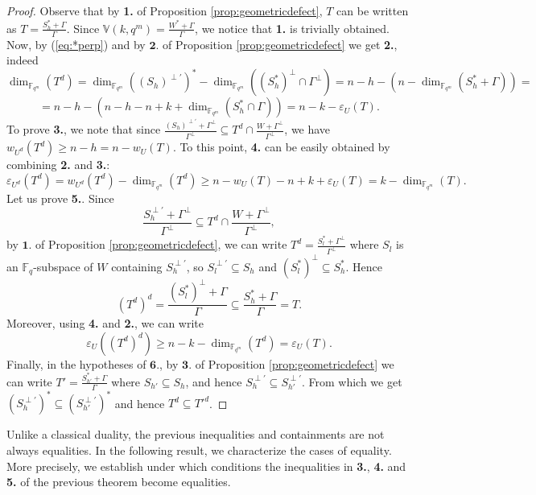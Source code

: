 \documentclass[11pt]{amsart}
\newcommand{\fqm}{\mathbb{F}_{q^m}}
\newcommand{\fq}{{\mathbb F}_{q}}
\begin{document}
\begin{proof}
Observe that by  {\bf 1.} of Proposition \ref{prop:geometricdefect}, $T$ can be written as $T=\frac{S_h^*+\Gamma}{\Gamma}$.
Since  $\mathbb{V}(k,q^m)=\frac{W^*+\Gamma}{\Gamma}$, we notice that {\bf 1.} is trivially obtained. Now, by (\ref{eq:*perp}) and by $\mathbf 2.$ of Proposition \ref{prop:geometricdefect} we get {\bf 2.}, indeed
\[ \dim_{\fqm} (T^d)= \dim_{\fqm} ((S_h)^{\perp'})^* - \dim_{\fqm} ((S_h^*)^\perp \cap \Gamma^\perp)= n-h -(n- \dim_{\fqm} (S_h^* + \Gamma))= \]
\[=n-h-(n-h-n+k+\dim_{\fqm}(S_h^* \cap \Gamma))=n-k-\varepsilon_{U}(T). \]
To prove {\bf 3.}, we note that since $\frac{(S_h)^{\perp'}+\Gamma^\perp}{\Gamma^\perp} \subseteq {T}^d \cap \frac{W+\Gamma^\perp}{\Gamma^\perp}$, we have $w_{U^d}(T^d)\geq n-h=n-w_{U}(T)$. 
To this point, {\bf 4.} can be easily obtained by combining {\bf 2.} and {\bf 3.}: 
\[\varepsilon_{U^d}(T^d)=w_{U^d}(T^d)-\dim_{\fqm} (T^d)\geq n-w_{U}(T) -n+k+\varepsilon_{U}(T)=k- \dim_{\fqm} (T).\]
Let us prove {\bf 5.}.  Since
 \[\frac{S_h^{\perp'}+\Gamma^\perp}{\Gamma^\perp} \subseteq {T}^d \cap \frac{W+\Gamma^\perp}{\Gamma^\perp},\]
  by $\mathbf 1.$ of Proposition \ref{prop:geometricdefect}, we can write ${T}^d=\frac{S_l^*+\Gamma^\perp}{\Gamma^\perp}$ where $S_l$ is an $\fq$-subspace of $W$ containing $S_h^{\perp'}$, so $S_l^{\perp' }\subseteq S_h$ and $(S_l^*)^{\perp}\subseteq S_h^*$. Hence
 \[ ({T}^d)^d=\frac{(S_l^*)^\perp+\Gamma}{\Gamma} \subseteq  \frac{S_h^*+\Gamma}{\Gamma}={T}.\]
 Moreover, using {\bf 4.} and {\bf 2.}, we can write
 \[\varepsilon_{{U}}(({T}^d)^d)\geq n-k-\dim_{\fqm} ({T}^d)=\varepsilon_{{U}}({T}).\]
Finally, in the hypotheses of $\mathbf 6.$, by $\mathbf{3.} $ of Proposition \ref{prop:geometricdefect} we can write $T'=\frac{S_{h'}^*+\Gamma}{\Gamma}$ where $S_{h'} \subseteq S_h$, and hence   $S_{h}^{\perp '} \subseteq S_{h'}^{\perp '}$. From which we get $(S_{h}^{\perp '})^* \subseteq (S_{h'}^{\perp '})^*$ and hence $T^d\subseteq T'^d$.
\end{proof}

Unlike a classical duality, the previous inequalities and containments are not always equalities. In the following result, we characterize the cases of equality.
More precisely, we establish under which conditions the inequalities in {\bf 3.}, {\bf 4.} and {\bf 5.} of the previous theorem become equalities.
\end{document}
